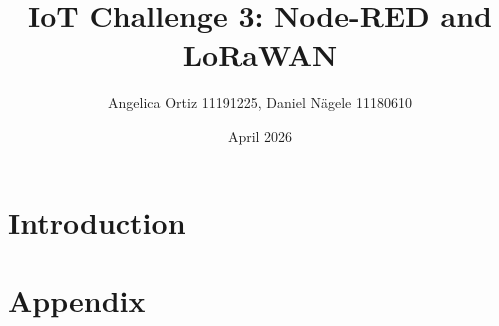 \documentclass{article}
\title{IoT Challenge 3: Node-RED and LoRaWAN}
\author{Angelica Ortiz 11191225, Daniel Nägele 11180610}
\date{April 2026}
\begin{document}
\maketitle
\thispagestyle{empty}
\newpage

\tableofcontents
\newpage

\section{Introduction}

\section{Appendix}
\end{document}
